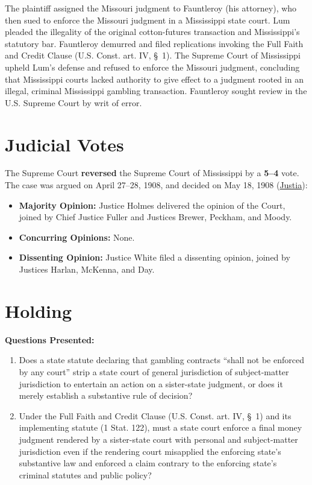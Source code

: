 \documentclass[12pt]{article}
\begin{document}
The plaintiff assigned the Missouri judgment to Fauntleroy (his attorney), who then sued to enforce the Missouri judgment in a Mississippi state court. Lum pleaded the illegality of the original cotton-futures transaction and Mississippi's statutory bar. Fauntleroy demurred and filed replications invoking the Full Faith and Credit Clause (U.S. Const. art. IV, \S~1). The Supreme Court of Mississippi upheld Lum's defense and refused to enforce the Missouri judgment, concluding that Mississippi courts lacked authority to give effect to a judgment rooted in an illegal, criminal Mississippi gambling transaction. Fauntleroy sought review in the U.S. Supreme Court by writ of error.

\section{Judicial Votes}
The Supreme Court \textbf{reversed} the Supreme Court of Mississippi by a \textbf{5--4} vote. The case was argued on April 27--28, 1908, and decided on May 18, 1908 (\href{https://supreme.justia.com/cases/federal/us/210/230/}{Justia}):

\begin{itemize}
    \item \textbf{Majority Opinion:} Justice Holmes delivered the opinion of the Court, joined by Chief Justice Fuller and Justices Brewer, Peckham, and Moody.
    \item \textbf{Concurring Opinions:} None.
    \item \textbf{Dissenting Opinion:} Justice White filed a dissenting opinion, joined by Justices Harlan, McKenna, and Day.
\end{itemize}

\section{Holding}
\textbf{Questions Presented:}

\begin{enumerate}
    \item Does a state statute declaring that gambling contracts ``shall not be enforced by any court'' strip a state court of general jurisdiction of subject-matter jurisdiction to entertain an action on a sister-state judgment, or does it merely establish a substantive rule of decision?
    \item Under the Full Faith and Credit Clause (U.S. Const. art. IV, \S~1) and its implementing statute (1 Stat. 122), must a state court enforce a final money judgment rendered by a sister-state court with personal and subject-matter jurisdiction even if the rendering court misapplied the enforcing state's substantive law and enforced a claim contrary to the enforcing state's criminal statutes and public policy?
\end{enumerate}
\end{document}
